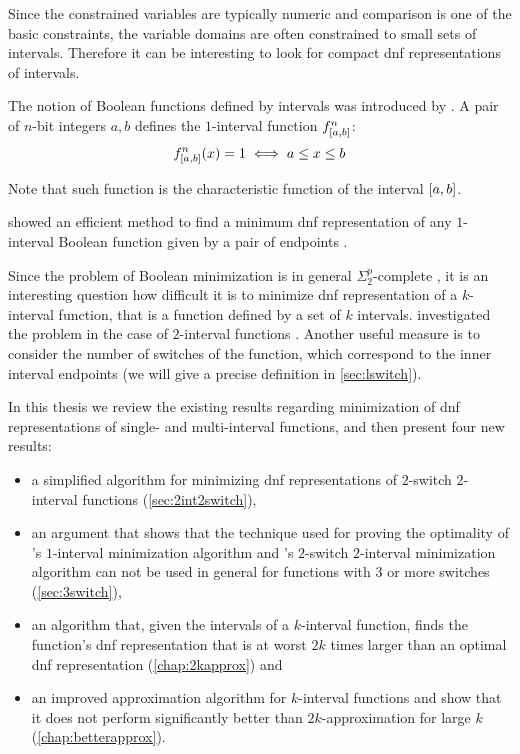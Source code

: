 Since the constrained variables are typically numeric
and comparison is one of the basic constraints,
the variable domains are often constrained
to small sets of intervals.
Therefore it can be interesting to look
for compact \acrshort{dnf}
representations of intervals.

The notion of
Boolean functions defined by intervals was introduced
by \citet{Schieber2005154}.
A pair of $n$-bit integers $a, b$
defines the $1$-interval function
$f^{n}_{[a, b]}$:
$$
f^{n}_{[a, b]} (x) = 1
\iff a \leq x \leq b
$$

Note that such function
is the characteristic function of the interval
$[a, b]$.

\citeauthor{Schieber2005154} showed an efficient method
to find a minimum \acrfull{dnf} representation
of any $1$-interval Boolean function
given by a pair of endpoints \citep{Schieber2005154}.

Since the problem of Boolean minimization is in general
$\Sigma_2^p$-complete \citep{Umans1998},
it is an interesting question how difficult it is
to minimize \acrshort{dnf} representation of
a $k$-interval function,
that is a function defined by a set of $k$ intervals.
\citeauthor{Dubovsky2012} investigated the problem
in the case of $2$-interval functions
\citep{Dubovsky2012}.
Another useful measure
is to consider the number of switches of the function,
which correspond to the inner interval endpoints
(we will give a precise definition
in \cref{sec:lswitch}).

In this thesis we review the existing results regarding
minimization of \acrshort{dnf} representations of
single- and multi-interval functions,
and then present four new results:

\begin{itemize}
\item a simplified algorithm
for minimizing \acrshort{dnf} representations
of $2$-switch
$2$-interval functions (\cref{sec:2int2switch}),

\item
an argument that shows
that the technique used for proving the optimality
of \citeauthor{Schieber2005154}'s
$1$-interval minimization algorithm
\citep{Schieber2005154}
and \citeauthor{Dubovsky2012}'s
$2$-switch $2$-interval minimization algorithm
\citep{Dubovsky2012}
can not be used in general for
functions with $3$ or more switches
(\cref{sec:3switch}),

\item
an algorithm
that,
given the intervals of a $k$-interval function,
finds the function's \acrshort{dnf} representation
that is at worst
$2k$ times larger
than an optimal \acrshort{dnf} representation
(\cref{chap:2kapprox}) and

\item
an improved approximation algorithm
for $k$-interval functions
and show that it does not perform significantly
better than $2k$-approximation for large $k$
(\cref{chap:betterapprox}).
\end{itemize}
